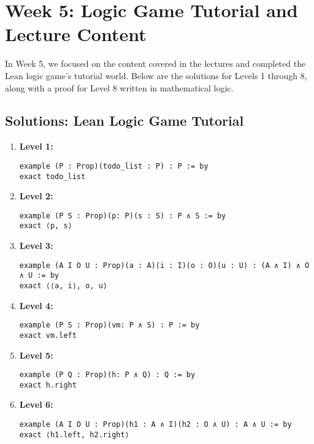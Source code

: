 \documentclass{article}
\begin{document}
\section{Week 5: Logic Game Tutorial and Lecture Content}
\label{sec:week5}

In Week 5, we focused on the content covered in the lectures and completed the Lean logic game's tutorial world. Below are the solutions for Levels 1 through 8, along with a proof for Level 8 written in mathematical logic.

\subsection*{Solutions: Lean Logic Game Tutorial}

\begin{enumerate}
    \item \textbf{Level 1:}
    \begin{lstlisting}[style=leanstyle]
example (P : Prop)(todo_list : P) : P := by
exact todo_list
    \end{lstlisting}

    \item \textbf{Level 2:}
    \begin{lstlisting}[style=leanstyle]
example (P S : Prop)(p: P)(s : S) : P ∧ S := by
exact ⟨p, s⟩
    \end{lstlisting}

    \item \textbf{Level 3:}
    \begin{lstlisting}[style=leanstyle]
example (A I O U : Prop)(a : A)(i : I)(o : O)(u : U) : (A ∧ I) ∧ O ∧ U := by
exact ⟨⟨a, i⟩, o, u⟩
    \end{lstlisting}

    \item \textbf{Level 4:}
    \begin{lstlisting}[style=leanstyle]
example (P S : Prop)(vm: P ∧ S) : P := by
exact vm.left
    \end{lstlisting}

    \item \textbf{Level 5:}
    \begin{lstlisting}[style=leanstyle]
example (P Q : Prop)(h: P ∧ Q) : Q := by
exact h.right
    \end{lstlisting}

    \item \textbf{Level 6:}
    \begin{lstlisting}[style=leanstyle]
example (A I O U : Prop)(h1 : A ∧ I)(h2 : O ∧ U) : A ∧ U := by
exact ⟨h1.left, h2.right⟩
    \end{lstlisting}


\end{enumerate}
\end{document}
